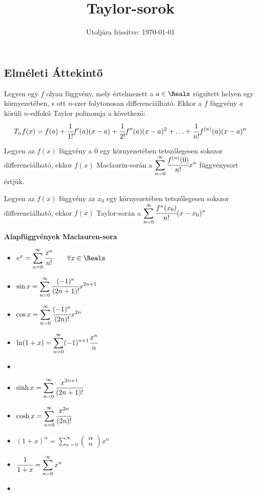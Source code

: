\documentclass[a4paper, 12pt]{scrartcl}
\title{Taylor-sorok}
\date{Utoljára frissítve: \today}
\begin{document}
\maketitle
\subsection{Elméleti Áttekintő}
\begin{definition}
    Legyen egy $f$ olyan függvény, mely értelmezett a $a\in \Reals$ rögzített helyen egy környezetében, s ott $n$-szer folytonosan differenciálható. Ekkor a $f$ függvény $a$ körüli $n$-edfokú Taylor polinomja a következő: 
    \[
    T_n f(x) = f(a) + \cfrac{1}{1!} f'(a)(x-a) + \cfrac{1}{2!} f''(a)(x-a)^2 + \ldots + \cfrac{1}{n!} f^{(n)}(a)(x-a)^n
    \]
\end{definition}

\begin{definition}
    Legyen az $f(x)$ függvény a $0$ egy környezetében tetszőlegesen sokszor
differenciálható, ekkor $f(x)$ Maclaurin-során a $\displaystyle \sum_{n=0}^{\infty} \cfrac{f^{(n)}(0)}{n!}x^n$
függvénysort
értjük.
\end{definition}

\begin{definition}
    Legyen az $f(x)$ függvény az $x_0$ egy környezetében tetszőlegesen sokszor differenciálható, ekkor $f(x)$ Taylor-során a $\displaystyle \sum_{n=0}^{\infty} \cfrac{f^{n}(x_0)}{n!}(x-x_0)^n$
\end{definition}
\begin{blueBox}
\textbf{Alapfüggvények Maclauren-sora}
\begin{multicols}{2}    
    \begin{itemize}
        \item[] $e^x = \displaystyle \sum_{n=0}^{\infty} \cfrac{x^n}{n!}\qquad \forall x \in \Reals$
        \item[] $\sin x = \displaystyle \sum_{n=0}^{\infty} \cfrac{(-1)^n}{(2n+1)!}x^{2n+1}$
        \item[] $\cos x = \displaystyle \sum_{n=0}^{\infty} \cfrac{(-1)^n}{(2n)!}x^{2n}$ 
        \item[] $\ln(1+x) = \displaystyle \sum_{n=0}^{\infty} (-1)^{n+1} \cfrac{x^n}{n}$
        \item[] 
        \item[] $\sinh x = \displaystyle \sum_{n=0}^{\infty} \cfrac{x^{2n+1}}{(2n+1)!}$
        \item[] $\cosh x = \displaystyle \sum_{n=0}^{\infty} \cfrac{x^{2n}}{(2n)!}$
        \item[] $(1+x)^{\alpha} = \displaystyle \sum_{n=0}^{\infty} \left(\begin{matrix}
            \alpha \\ 
            n
        \end{matrix}
        \right)x^n$
        \item[] $\cfrac{1}{1+x} = \displaystyle \sum_{n=0}^{\infty} x^n$
        \item[] 
    \end{itemize}
\end{multicols}
\end{blueBox}
\clearpage
\end{document}
